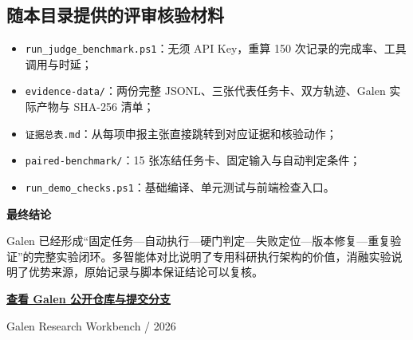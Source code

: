 \documentclass[UTF8,11pt,a4paper]{ctexart}
\newcommand{\code}[1]{\texttt{\small #1}}
\begin{document}
\subsection*{随本目录提供的评审核验材料}
\begin{itemize}
  \item \code{run\_judge\_benchmark.ps1}：无须 API Key，重算 150 次记录的完成率、工具调用与时延；
  \item \code{evidence-data/}：两份完整 JSONL、三张代表任务卡、双方轨迹、Galen 实际产物与 SHA-256 清单；
  \item \code{证据总表.md}：从每项申报主张直接跳转到对应证据和核验动作；
  \item \code{paired-benchmark/}：15 张冻结任务卡、固定输入与自动判定条件；
  \item \code{run\_demo\_checks.ps1}：基础编译、单元测试与前端检查入口。
\end{itemize}
\begin{darkbox}
\textbf{最终结论}\par
Galen 已经形成“固定任务—自动执行—硬门判定—失败定位—版本修复—重复验证”的完整实验闭环。多智能体对比说明了专用科研执行架构的价值，消融实验说明了优势来源，原始记录与脚本保证结论可以复核。
\end{darkbox}
\vfill
\begin{center}
\href{https://github.com/Drehabwen/Galen/tree/galen-research-workbench}{\color{blue}\bfseries 查看 Galen 公开仓库与提交分支}\par
\small\color{muted}Galen Research Workbench  /  2026
\end{center}
\end{document}
